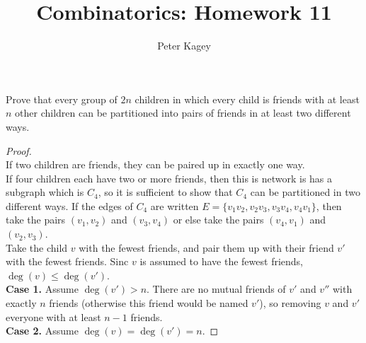 \documentclass{article}
\newenvironment{problem}[2][Problem]{\begin{trivlist}
\item[\hskip \labelsep {\bfseries #1}\hskip \labelsep {\bfseries #2.}]}{\end{trivlist}}
\newcommand{\set}[1]{\{ #1 \}}
\begin{document}
\title{Combinatorics: Homework 11}
\author{Peter Kagey}

\maketitle

\begin{problem}{1}
  Prove that every group of $2n$ children in which every child is friends with
  at least $n$ other children can be partitioned into pairs of friends in at
  least two different ways.
\end{problem}

\begin{proof} $ $ \\
  If two children are friends, they can be paired up in exactly one way.
  \\
  If four children each have two or more friends, then this is network is
  has a subgraph which is $C_4$, so it is
  sufficient to show that $C_4$ can be partitioned in two different ways.
  If the edges of $C_4$ are written $E = \set {v_1v_2, v_2v_3, v_3v_4, v_4v_1}$,
  then take the pairs $(v_1, v_2)$ and $(v_3, v_4)$ or else take the pairs
  $(v_4, v_1)$ and $(v_2, v_3)$.
  \\
  Take the child $v$ with the fewest friends, and pair them up with their friend
  $v'$ with the fewest friends. Sinc $v$ is assumed to have the fewest friends,
  $\deg(v) \leq \deg(v')$.
  \\
  \textbf{Case 1.} Assume $\deg(v') > n$. There are no mutual friends of $v'$ and
  $v''$ with exactly $n$ friends (otherwise this friend would be named $v'$), so
  removing $v$ and $v'$ everyone with at least $n-1$ friends.
  \\
  \textbf{Case 2.} Assume $\deg(v) = \deg(v') = n$.
\end{proof}
\pagebreak
\end{document}

